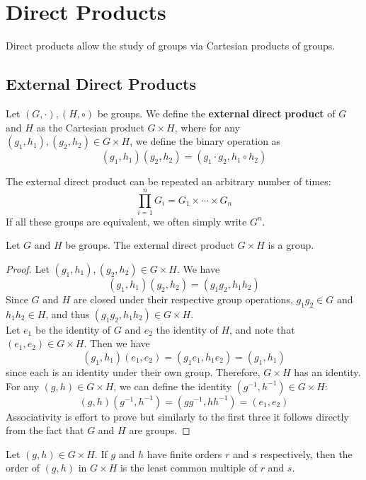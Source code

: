 \documentclass[12pt, letterpaper]{report}
\begin{document}
\section{Direct Products}
Direct products allow the study of groups via Cartesian products of groups.
\subsection{External Direct Products}
\begin{definition}
	Let \((G,\cdot),(H,\circ )\) be groups. We define the \textbf{external} \textbf{direct} \textbf{product} of \(G\) and \(H\) as the Cartesian product \(G\times H\), where for any \((g_1,h_1),(g_2,h_2)\in G\times H\), we define the binary operation as 
	\[
		(g_1,h_1)(g_2,h_2)=(g_1\cdot g_2,h_{1}\circ h_2 )
	\]
\end{definition}
\begin{remark}
	The external direct product can be repeated an arbitrary number of times:
	\[
		\prod_{i=1}^n G_i = G_1 \times \cdots \times G_n
	\]
	If all these groups are equivalent, we often simply write \(G^n\).
\end{remark}
\begin{proposition}
	Let \(G\) and \(H\) be groups. The external direct product \(G\times H\) is a group.
\end{proposition}
\begin{proof}
	Let \((g_1,h_1),(g_2,h_2)\in G\times H\). We have
	\[
		(g_1,h_1)(g_2,h_2)=(g_1 g_2,h_1 h_2)
	\]
	Since \(G\) and \(H\) are closed under their respective group operations, \(g_1 g_2 \in G\) and \(h_1 h_2 \in H\), and thus \((g_1 g_2,h_1 h_2)\in G\times H\).\\
	Let \(e_1\) be the identity of \(G\) and \(e_2\) the identity of \(H\), and note that \((e_1,e_2)\in G\times H\). Then we have 
	\[
		(g_1,h_1)(e_1,e_2)=(g_1 e_1,h_1 e_2)=(g_1,h_1)
	\]
	since each is an identity under their own group. Therefore, \(G\times H\) has an identity.\\
	For any \((g,h)\in G\times H\), we can define the identity \(\left( g^{-1} ,h^{-1}  \right)\in G\times H \):
	\[
		(g,h)\left( g^{-1} ,h^{-1}  \right) = \left( gg^{-1} ,hh^{-1}  \right) =\left( e_1,e_2 \right) 
	\]
	Associativity is effort to prove but similarly to the first three it follows directly from the fact that \(G\) and \(H\) are groups.
\end{proof}
\begin{theorem}
	Let \((g,h)\in G\times H\). If \(g\) and \(h\) have finite orders \(r\) and \(s\) respectively, then the order of \((g,h)\) in \(G\times H\) is the least common multiple of \(r\) and \(s\).
\end{theorem}
\end{document}
